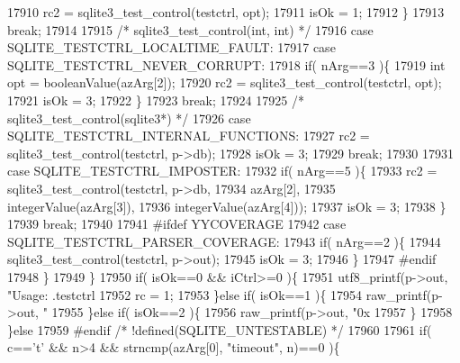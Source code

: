 \begin{DoxyCode}
{{{{{{{{{{{{{{{{{{{{{{{{{{{{{{{{{{{{{{{{{{{{{{{{{{{{{{{{{{{{{{{{{{{{{{{{{{{{{{{{{{{{{{{{{{{{{{{{{{{{{{{{{{{{{{{{{{{{{{{{{{{{{{{{{{{{{{{{{{{{{{{{{17910             rc2 = sqlite3_test_control(testctrl, opt);
17911             isOk = 1;
17912           \}
17913           \textcolor{keywordflow}{break};
17914 
17915         \textcolor{comment}{/* sqlite3\_test\_control(int, int) */}
17916         \textcolor{keywordflow}{case} SQLITE_TESTCTRL_LOCALTIME_FAULT:
17917         \textcolor{keywordflow}{case} SQLITE_TESTCTRL_NEVER_CORRUPT:
17918           \textcolor{keywordflow}{if}( nArg==3 )\{
17919             \textcolor{keywordtype}{int} opt = booleanValue(azArg[2]);
17920             rc2 = sqlite3_test_control(testctrl, opt);
17921             isOk = 3;
17922           \}
17923           \textcolor{keywordflow}{break};
17924 
17925         \textcolor{comment}{/* sqlite3\_test\_control(sqlite3*) */}
17926         \textcolor{keywordflow}{case} SQLITE_TESTCTRL_INTERNAL_FUNCTIONS:
17927           rc2 = sqlite3_test_control(testctrl, p->db);
17928           isOk = 3;
17929           \textcolor{keywordflow}{break};
17930 
17931         \textcolor{keywordflow}{case} SQLITE_TESTCTRL_IMPOSTER:
17932           \textcolor{keywordflow}{if}( nArg==5 )\{
17933             rc2 = sqlite3_test_control(testctrl, p->db,
17934                           azArg[2],
17935                           integerValue(azArg[3]),
17936                           integerValue(azArg[4]));
17937             isOk = 3;
17938           \}
17939           \textcolor{keywordflow}{break};
17940 
17941 \textcolor{preprocessor}{#ifdef YYCOVERAGE}
17942         \textcolor{keywordflow}{case} SQLITE_TESTCTRL_PARSER_COVERAGE:
17943           \textcolor{keywordflow}{if}( nArg==2 )\{
17944             sqlite3_test_control(testctrl, p->out);
17945             isOk = 3;
17946           \}
17947 \textcolor{preprocessor}{#endif}
17948       \}
17949     \}
17950     \textcolor{keywordflow}{if}( isOk==0 && iCtrl>=0 )\{
17951       utf8_printf(p->out, \textcolor{stringliteral}{"Usage: .testctrl %
17952       rc = 1;
17953     \}\textcolor{keywordflow}{else} \textcolor{keywordflow}{if}( isOk==1 )\{
17954       raw_printf(p->out, \textcolor{stringliteral}{"%
17955     \}\textcolor{keywordflow}{else} \textcolor{keywordflow}{if}( isOk==2 )\{
17956       raw_printf(p->out, \textcolor{stringliteral}{"0x%
17957     \}
17958   \}\textcolor{keywordflow}{else}
17959 \textcolor{preprocessor}{#endif }\textcolor{comment}{/* !defined(SQLITE\_UNTESTABLE) */}\textcolor{preprocessor}{}
17960 
17961   \textcolor{keywordflow}{if}( c==\textcolor{charliteral}{'t'} && n>4 && strncmp(azArg[0], \textcolor{stringliteral}{"timeout"}, n)==0 )\{
}}}}}}}}}}}}}}}}}}}}}}}}}}}}}}}}}}}}}}}}}}}}}}}}}}}}}}}}}}}}}}}}}}}}}}}}}}}}}}}}}}}}}}}}}}}}}}}}}}}}}}}}}}}}}}}}}}}}}}}}}}}}}}}}}}}}}}}}}}}}}}}}}}}}
\end{DoxyCode}
